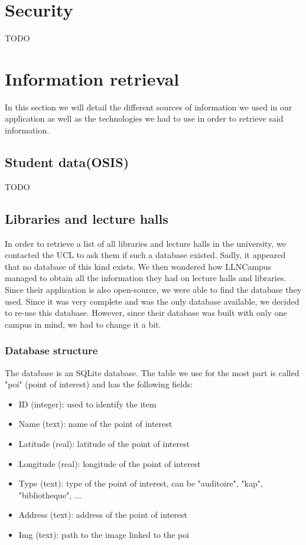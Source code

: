 \documentclass[11pt, a4paper]{report}
\begin{document}
\section{Security}

TODO

\section{Information retrieval}

In this section we will detail the different sources of information we used in our application as well as the technologies we had to use in order to retrieve said information. 
\subsection{Student data(OSIS)}
TODO
\subsection{Libraries and lecture halls}

In order to retrieve a list of all libraries and lecture halls in the university, we contacted the UCL to ask them if such a database existed. Sadly, it appeared that no database of this kind exists. We then wondered how LLNCampus managed to obtain all the information they had on lecture halls and libraries. Since their application is also open-source, we were able to find the database they used. Since it was very complete and was the only database available, we decided to re-use this database. However, since their database was built with only one campus in mind, we had to change it a bit.

\subsubsection{Database structure}
 
The database is an SQLite database. The table we use for the most part is called "poi" (point of interest) and has the following fields:

\begin{itemize}
\item ID (integer): used to identify the item
\item Name (text): name of the point of interest
\item Latitude (real): latitude of the point of interest
\item Longitude (real): longitude of the point of interest
\item Type (text): type of the point of interest, can be "auditoire", "kap",   "bibliotheque", ...
\item Address (text): address of the point of interest
\item Img (text): path to the image linked to the poi
\end{itemize}
\end{document}
